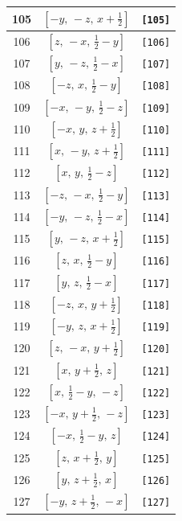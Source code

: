 \documentclass[fleqn,8pt]{jsarticle}
\begin{document}
\begin{longtable}{ccc}
105 & $\left[ - y,\, - z,\, x + \frac{1}{2} \right]$ & {\tt [105]} \\ \hline
106 & $\left[ z,\, - x,\, \frac{1}{2} - y \right]$ & {\tt [106]} \\ \hline
107 & $\left[ y,\, - z,\, \frac{1}{2} - x \right]$ & {\tt [107]} \\ \hline
108 & $\left[ - z,\, x,\, \frac{1}{2} - y \right]$ & {\tt [108]} \\ \hline
109 & $\left[ - x,\, - y,\, \frac{1}{2} - z \right]$ & {\tt [109]} \\ \hline
110 & $\left[ - x,\, y,\, z + \frac{1}{2} \right]$ & {\tt [110]} \\ \hline
111 & $\left[ x,\, - y,\, z + \frac{1}{2} \right]$ & {\tt [111]} \\ \hline
112 & $\left[ x,\, y,\, \frac{1}{2} - z \right]$ & {\tt [112]} \\ \hline
113 & $\left[ - z,\, - x,\, \frac{1}{2} - y \right]$ & {\tt [113]} \\ \hline
114 & $\left[ - y,\, - z,\, \frac{1}{2} - x \right]$ & {\tt [114]} \\ \hline
115 & $\left[ y,\, - z,\, x + \frac{1}{2} \right]$ & {\tt [115]} \\ \hline
116 & $\left[ z,\, x,\, \frac{1}{2} - y \right]$ & {\tt [116]} \\ \hline
117 & $\left[ y,\, z,\, \frac{1}{2} - x \right]$ & {\tt [117]} \\ \hline
118 & $\left[ - z,\, x,\, y + \frac{1}{2} \right]$ & {\tt [118]} \\ \hline
119 & $\left[ - y,\, z,\, x + \frac{1}{2} \right]$ & {\tt [119]} \\ \hline
120 & $\left[ z,\, - x,\, y + \frac{1}{2} \right]$ & {\tt [120]} \\ \hline
121 & $\left[ x,\, y + \frac{1}{2},\, z \right]$ & {\tt [121]} \\ \hline
122 & $\left[ x,\, \frac{1}{2} - y,\, - z \right]$ & {\tt [122]} \\ \hline
123 & $\left[ - x,\, y + \frac{1}{2},\, - z \right]$ & {\tt [123]} \\ \hline
124 & $\left[ - x,\, \frac{1}{2} - y,\, z \right]$ & {\tt [124]} \\ \hline
125 & $\left[ z,\, x + \frac{1}{2},\, y \right]$ & {\tt [125]} \\ \hline
126 & $\left[ y,\, z + \frac{1}{2},\, x \right]$ & {\tt [126]} \\ \hline
127 & $\left[ - y,\, z + \frac{1}{2},\, - x \right]$ & {\tt [127]} \\ \hline

\end{longtable}
\end{document}
